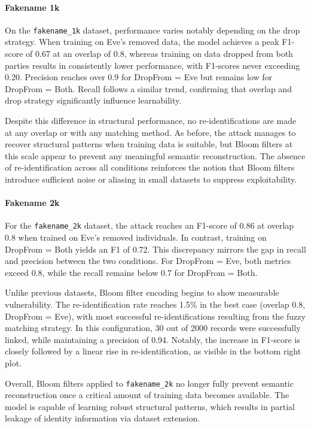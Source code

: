 \paragraph{Fakename 1k}

On the \texttt{fakename\_1k} dataset, performance varies notably depending on the drop strategy. When training on Eve’s removed data, the model achieves a peak F1-score of 0.67 at an overlap of 0.8, whereas training on data dropped from both parties results in consistently lower performance, with F1-scores never exceeding 0.20. Precision reaches over 0.9 for DropFrom = Eve but remains low for DropFrom = Both. Recall follows a similar trend, confirming that overlap and drop strategy significantly influence learnability.

Despite this difference in structural performance, no re-identifications are made at any overlap or with any matching method. As before, the attack manages to recover structural patterns when training data is suitable, but Bloom filters at this scale appear to prevent any meaningful semantic reconstruction. The absence of re-identification across all conditions reinforces the notion that Bloom filters introduce sufficient noise or aliasing in small datasets to suppress exploitability.


\paragraph{Fakename 2k}

For the \texttt{fakename\_2k} dataset, the attack reaches an F1-score of 0.86 at overlap 0.8 when trained on Eve’s removed individuals. In contrast, training on DropFrom = Both yields an F1 of 0.72. This discrepancy mirrors the gap in recall and precision between the two conditions. For DropFrom = Eve, both metrics exceed 0.8, while the recall remains below 0.7 for DropFrom = Both.

Unlike previous datasets, Bloom filter encoding begins to show measurable vulnerability. The re-identification rate reaches 1.5\% in the best case (overlap 0.8, DropFrom = Eve), with most successful re-identifications resulting from the fuzzy matching strategy. In this configuration, 30 out of 2000 records were successfully linked, while maintaining a precision of 0.94. Notably, the increase in F1-score is closely followed by a linear rise in re-identification, as visible in the bottom right plot.

Overall, Bloom filters applied to \texttt{fakename\_2k} no longer fully prevent semantic reconstruction once a critical amount of training data becomes available. The model is capable of learning robust structural patterns, which results in partial leakage of identity information via dataset extension.

